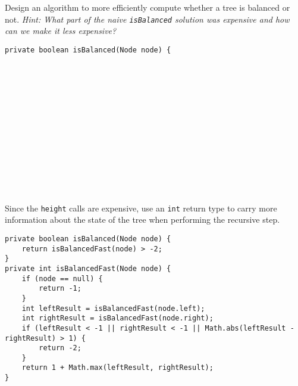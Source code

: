 \question Design an algorithm to more efficiently compute whether a tree is balanced or not. \textit{Hint: What part of the naive \texttt{isBalanced} solution was expensive and how can we make it less expensive?}

\ifprintanswers
\else
\begin{lstlisting}
private boolean isBalanced(Node node) {















\end{lstlisting}
\fi

\begin{solution}
Since the \texttt{height} calls are expensive, use an \texttt{int} return type to carry more information about the state of the tree when performing the recursive step.

\begin{lstlisting}
private boolean isBalanced(Node node) {
    return isBalancedFast(node) > -2;
}
private int isBalancedFast(Node node) {
    if (node == null) {
        return -1;
    }
    int leftResult = isBalancedFast(node.left);
    int rightResult = isBalancedFast(node.right);
    if (leftResult < -1 || rightResult < -1 || Math.abs(leftResult - rightResult) > 1) {
        return -2;
    }
    return 1 + Math.max(leftResult, rightResult);
}
\end{lstlisting}
\end{solution}